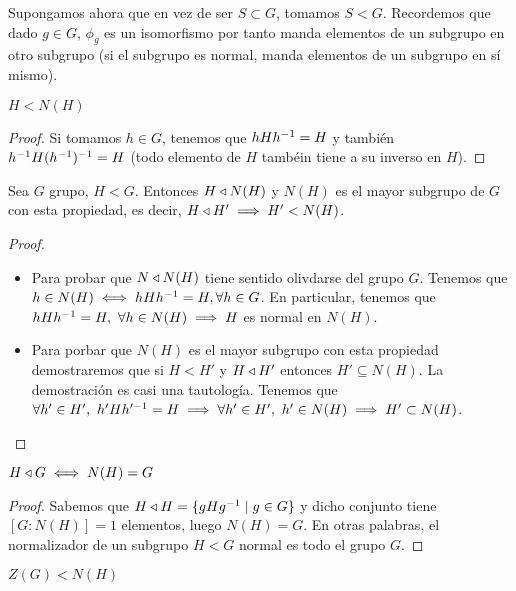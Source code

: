 Supongamos ahora que en vez de ser $S \subset G$, tomamos $S < G$. Recordemos que dado $g\in G$, $\phi_g$ es un isomorfismo por tanto manda elementos de un subgrupo en otro subgrupo (si el subgrupo es normal, manda elementos de un subgrupo en sí mismo).

\begin{pro}
	$H < N(H)$
\end{pro}

\begin{proof}
	Si tomamos $h \in G$, tenemos que $hHh^{-1} = H$ y también $h^{-1}H(h^{-1})^{-1} = H$ (todo elemento de $H$ tambéin tiene a su inverso en $H$).
\end{proof}

\begin{thm}
	Sea $G$ grupo, $H < G$. Entonces $H \mathbin{\triangleleft} N(H)$ y $N(H)$ es el mayor subgrupo de $G$ con esta propiedad, es decir, $H \mathbin{\triangleleft} H' \implies H' < N(H)$.
\end{thm}

\begin{proof}$ $\newline
	\begin{itemize}
		\item Para probar que $N\mathbin{\triangleleft} N(H)$ tiene sentido olivdarse del grupo $G$. Tenemos que $h \in N(H) \iff hHh^{-1} = H, \forall h \in G$. En particular, tenemos que $hHh^{-1} = H,\ \forall h \in N(H) \implies H$ es normal en $N(H)$.
		
		\item Para porbar que $N(H)$ es el mayor subgrupo con esta propiedad demostraremos que si $H < H'$ y $H \mathbin{\triangleleft} H'$ entonces $H' \subseteq N(H)$. La demostración es casi una tautología. Tenemos que $\forall h' \in H',\ h'Hh'^{-1} = H \implies \forall h' \in H',\ h' \in N(H) \implies H' \subset N(H)$.
	\end{itemize}
\end{proof}

\begin{cor}
	$H \mathbin{\triangleleft} G \iff N(H) = G$
\end{cor}

\begin{proof}
	Sabemos que $H\mathbin{\triangleleft} H = \{gHg^{-1} \mid g \in G\}$ y dicho conjunto tiene $[G:N(H)] = 1$ elementos, luego $N(H) = G$. En otras palabras, el normalizador de un subgrupo $H < G$ normal es todo el grupo $G$.
\end{proof}

\begin{pro}
	$Z(G) < N(H)$
\end{pro}

